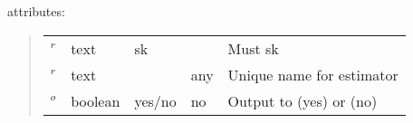 \documentclass[letterpaper,10pt,english]{sphinxmanual}
\begin{document}
attributes:
\begin{quote}


\begin{savenotes}\sphinxattablestart
\centering
\begin{tabulary}{\linewidth}[t]{|T|T|T|T|T|}
\hline
\sphinxstyletheadfamily 
{}
&\sphinxstyletheadfamily 
{}
&\sphinxstyletheadfamily 
{}
&\sphinxstyletheadfamily 
{}
&\sphinxstyletheadfamily 
{}
\\
\hline
{}\(^r\)
&
text
&
sk
&&
Must sk
\\
\hline
{}\(^r\)
&
text
&
&
any
&
Unique name for estimator
\\
\hline
{}\(^o\)
&
boolean
&
yes/no
&
no
&
Output to  (yes) or  (no)
\\
\hline
\end{tabulary}
\par
\sphinxattableend\end{savenotes}
\end{quote}
\end{document}
